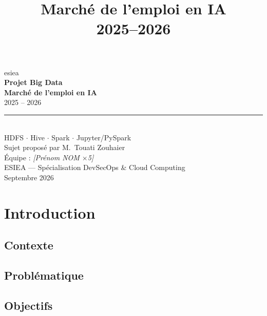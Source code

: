 \documentclass[11pt,a4paper]{report}
\title{\titlefont\Huge\bfseries\color{esienavy}Marché de l'emploi en IA\\[4pt]\Large 2025--2026}
\author{}
\date{}
\begin{document}
\begin{titlepage}
\vspace*{3cm}
\begin{center}
  {\titlefont\color{white}\Large esiea}\\[2.5cm]
  {\titlefont\color{white}\Huge\bfseries Projet Big Data\\[6pt] Marché de l'emploi en IA}\\[10pt]
  {\titlefont\color{white}\huge 2025 -- 2026}\\[18pt]
  {\color{esieaorange}\rule{6cm}{3pt}}\\[18pt]
  {\color{white}\large HDFS $\cdot$ Hive $\cdot$ Spark $\cdot$ Jupyter/PySpark}\\[40pt]
  {\color{white}\normalsize Sujet proposé par M.~Touati Zouhaier}\\[4pt]
  {\color{white}\normalsize Équipe : \emph{[Prénom NOM $\times$5]}}\\[4pt]
  {\color{white}\normalsize ESIEA — Spécialisation DevSecOps \& Cloud Computing}\\[4pt]
  {\color{white}\normalsize Septembre 2026}
\end{center}
\end{titlepage}
\restoregeometry

\tableofcontents
\clearpage


\chapter{Introduction}
\section{Contexte}

\section{Problématique}

\section{Objectifs}
\end{document}
